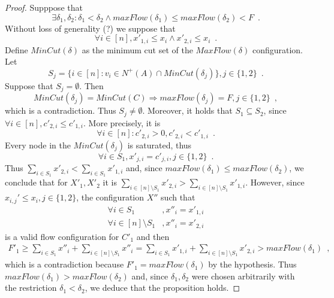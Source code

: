 \begin{proof}
  Supppose that
  \begin{equation*}
    \exists \delta_1, \delta_2 : \delta_1 < \delta_2 \wedge maxFlow\left(\delta_1\right) \leq maxFlow\left(\delta_2\right)
    < F \enspace.
  \end{equation*}
  Without loss of generality (?) we suppose that
  \begin{equation*}
    \forall i \in [n], x'_{1, i} \leq x_i \wedge x'_{2, i} \leq x_i \enspace.
  \end{equation*}
  Define $MinCut\left(\delta\right)$ as the minimum cut set of the $MaxFlow\left(\delta\right)$ configuration. Let
  \begin{equation*}
    S_j = \{i \in [n] : v_i \in N^{+}\left(A\right) \cap MinCut\left(\delta_j\right)\}, j \in \{1, 2\} \enspace.
  \end{equation*}
  Suppose that $S_j = \emptyset$. Then
  \begin{equation*}
    MinCut\left(\delta_j\right) = MinCut\left(C\right) \Rightarrow maxFlow\left(\delta_j\right) = F, j \in \{1, 2\}
    \enspace,
  \end{equation*}
  which is a contradiction. Thus $S_j \neq \emptyset$.
  Moreover, it holds that $S_1 \subseteq S_2$, since $\forall i \in [n], c'_{2, i} \leq c'_{1, i}$. More precisely, it is
  \begin{equation*}
    \forall i \in [n] : c'_{2, i} > 0, c'_{2, i} < c'_{1, i} \enspace.
  \end{equation*}
  Every node in the $MinCut\left(\delta_j\right)$ is saturated, thus
  \begin{equation*}
    \forall i \in S_1, x'_{j, i} = c'_{j, i}, j \in \{1, 2\} \enspace.
  \end{equation*}
  Thus $\sum\limits_{i \in S_1} x'_{2, i} < \sum\limits_{i \in S_1}x'_{1, i}$ and, since $maxFlow(\delta_1) \leq
  maxFlow(\delta_2)$, we conclude that for $X'_1, X'_2$ it is $\sum\limits_{i \in [n] \setminus S_1}x'_{2, i} >
  \sum\limits_{i \in [n] \setminus S_1}x'_{1, i}$. However, since $x_{i,j}' \leq x_i, j \in \{1,2\}$, the configuration $X''$
  such that
  \begin{align*}
    \forall i \in S_1&, x''_i = x'_{1, i} \\
    \forall i \in [n] \setminus S_1&, x''_i = x'_{2, i}
  \end{align*}
  is a valid flow configuration for $C'_1$ and then
  \begin{equation*}
  \begin{gathered}
    F'_1 \geq \sum\limits_{i \in S_1}x''_i + \sum\limits_{i \in [n] \setminus S_1}x''_i = \sum\limits_{i \in S_1}x'_{1, i} +
    \sum\limits_{i \in [n] \setminus S_1}x'_{2, i} > maxFlow\left(\delta_1\right)
    \enspace,
  \end{gathered}
  \end{equation*}
  which is a contradiction because $F'_1 = maxFlow\left(\delta_1\right)$ by the hypothesis. Thus
  $maxFlow\left(\delta_1\right) > maxFlow\left(\delta_2\right)$ and, since $\delta_1, \delta_2$ were chosen arbitrarily with
  the restriction $\delta_1 < \delta_2$, we deduce that the proposition holds.
\end{proof}
